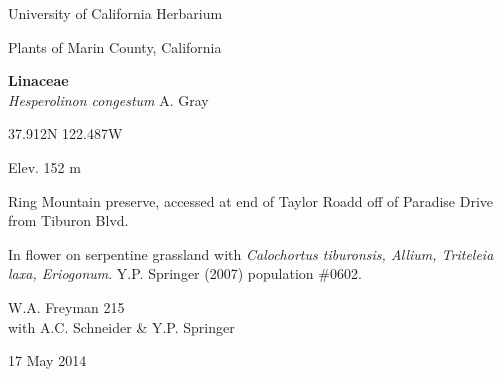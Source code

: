 \documentclass[letterpaper,10pt]{article}
\begin{document}
\begin{minipage}[t]{0.40\textwidth}

\begin{center}
University of California Herbarium \\
\begin{large}
Plants of Marin County, California \\
\end{large}
\vspace{\baselineskip}
\textbf{Linaceae} \\
\textit{Hesperolinon congestum} A. Gray\\
\end{center}

\begin{footnotesize}

\begin{multicols}{2}
37.912\textdegree N 122.487\textdegree W
\columnbreak
\begin{flushright}
Elev. 152 m
\end{flushright}
\end{multicols}

Ring Mountain preserve, accessed at end of Taylor Roadd off of Paradise Drive from Tiburon Blvd.
\vspace{\baselineskip}

In flower on serpentine grassland with \textit{Calochortus tiburonsis, Allium, Triteleia laxa, Eriogonum}. Y.P. Springer (2007) population \#0602.

\begin{multicols}{2}
W.A. Freyman 215 \\
with A.C. Schneider \& Y.P. Springer
\columnbreak
\begin{flushright}
17 May 2014
\end{flushright}
\end{multicols}

\end{footnotesize}

\end{minipage}

\vspace{2cm}
%
%

%
%
\end{document}
